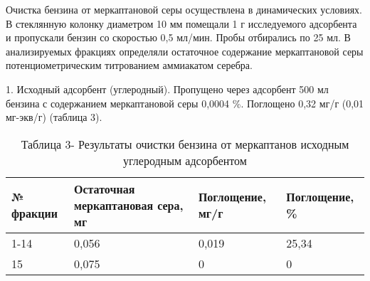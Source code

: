 \begin{table}[H]
\caption*{Таблица 2 - Результаты очистки нефти с помощью углеродного адсорбента}
\centering
{}
\end{table}

\begin{multicols}{2}
Очистка бензина от меркаптановой серы осуществлена в динамических
условиях. В стеклянную колонку диаметром 10 мм помещали 1 г исследуемого
адсорбента и пропускали бензин со скоростью 0,5 мл/мин. Пробы отбирались
по 25 мл. В анализируемых фракциях определяли остаточное содержание
меркаптановой серы потенциометрическим титрованием аммиакатом серебра.

1. Исходный адсорбент (углеродный). Пропущено через адсорбент 500 мл
бензина с содержанием меркаптановой серы 0,0004 \%. Поглощено 0,32 мг/г
(0,01 мг-экв/г) (таблица 3).
\end{multicols}

\begin{table}[H]
\caption*{Таблица 3- Результаты очистки бензина от меркаптанов исходным углеродным адсорбентом}
\centering
\begin{tabular}{|l|l|l|l|}
\hline
№ фракции & Остаточная меркаптановая сера, мг & Поглощение, мг/г & Поглощение, \% \\ \hline
1-14 & 0,056 & 0,019 & 25,34 \\ \hline
15 & 0,075 & 0 & 0 \\ \hline
\end{tabular}
\end{table}

